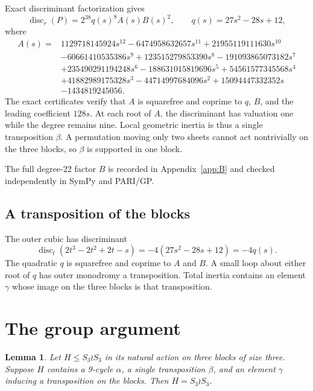 \documentclass[11pt]{article}
\newtheorem{lemma}[theorem]{Lemma}
\newcommand{\disc}{\operatorname{disc}}
\begin{document}
Exact discriminant factorization gives
\begin{equation}
\disc_r(P)=2^{38}q(s)^8A(s)B(s)^2,
\qquad q(s)=27s^2-28s+12,
\label{eq:disc}
\end{equation}
where
\begingroup\small
\begin{align*}
A(s)={}&1129718145924s^{12}-6474958632657s^{11}
+21955119111630s^{10}\\
&-60661410535386s^9+123515279853390s^8-191093865073182s^7\\
&+235490291194248s^6-188631015819696s^5+54561577345568s^4\\
&+41882989175328s^3-44714997684096s^2+15094447332352s\\
&-1434819245056.
\end{align*}
\endgroup
The exact certificates verify that $A$ is squarefree and coprime to $q$, $B$,
and the leading coefficient $128s$. At each root of $A$, the discriminant has
valuation one while the degree remains nine. Local geometric inertia is thus a
single transposition $\beta$. A permutation moving only two sheets cannot act
nontrivially on the three blocks, so $\beta$ is supported in one block.

The full degree-22 factor $B$ is recorded in Appendix~\ref{app:B} and checked
independently in SymPy and PARI/GP.

\subsection{A transposition of the blocks}

The outer cubic has discriminant
\[
\disc_t(2t^3-2t^2+2t-s)=-4(27s^2-28s+12)=-4q(s).
\]
The quadratic $q$ is squarefree and coprime to $A$ and $B$. A small loop about
either root of $q$ has outer monodromy a transposition. Total inertia contains
an element $\gamma$ whose image on the three blocks is that transposition.

\section{The group argument}

\begin{lemma}\label{lem:group}
Let $H\leq S_3\wr S_3$ in its natural action on three blocks of size three.
Suppose $H$ contains a 9-cycle $\alpha$, a single transposition $\beta$, and
an element $\gamma$ inducing a transposition on the blocks. Then
$H=S_3\wr S_3$.
\end{lemma}
\end{document}
